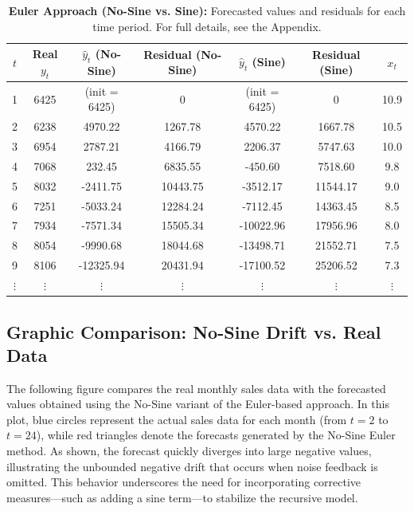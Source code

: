 \documentclass[10pt]{article}
\begin{document}
\begin{table}[H]
\centering
\begin{tabular}{ccccccc}
\toprule
\(t\) & Real \(y_t\) & \(\hat{y}_t\) (No-Sine) & Residual (No-Sine) & \(\hat{y}_t\) (Sine) & Residual (Sine) & \(x_t\) \\
\midrule
1  & 6425 & (init = 6425)   & 0        & (init = 6425)   & 0        & 10.9\\[5pt]
2  & 6238 & 4970.22        & 1267.78  & 4570.22        & 1667.78  & 10.5\\[5pt]
3  & 6954 & 2787.21        & 4166.79  & 2206.37        & 5747.63  & 10.0\\[5pt]
4  & 7068 & 232.45         & 6835.55  & -450.60        & 7518.60  & 9.8\\[5pt]
5  & 8032 & -2411.75       & 10443.75 & -3512.17       & 11544.17 & 9.0\\[5pt]
6  & 7251 & -5033.24       & 12284.24 & -7112.45       & 14363.45 & 8.5\\[5pt]
7  & 7934 & -7571.34       & 15505.34 & -10022.96      & 17956.96 & 8.0\\[5pt]
8  & 8054 & -9990.68       & 18044.68 & -13498.71      & 21552.71 & 7.5\\[5pt]
9  & 8106 & -12325.94      & 20431.94 & -17100.52      & 25206.52 & 7.3\\[5pt]
\(\vdots\) & \(\vdots\) & \(\vdots\) & \(\vdots\) & \(\vdots\) & \(\vdots\) & \(\vdots\)\\
\bottomrule
\end{tabular}
\caption{\textbf{Euler Approach (No-Sine vs. Sine):} Forecasted values and residuals for each time period. For full details, see the Appendix.}
\label{tab:euler_table4_24}
\end{table}


\subsection{Graphic Comparison: No-Sine Drift vs. Real Data}

The following figure compares the real monthly sales data with the forecasted values obtained using the No-Sine variant of the Euler-based approach. In this plot, blue circles represent the actual sales data for each month (from \(t=2\) to \(t=24\)), while red triangles denote the forecasts generated by the No-Sine Euler method. As shown, the forecast quickly diverges into large negative values, illustrating the unbounded negative drift that occurs when noise feedback is omitted. This behavior underscores the need for incorporating corrective measures—such as adding a sine term—to stabilize the recursive model.
\end{document}
